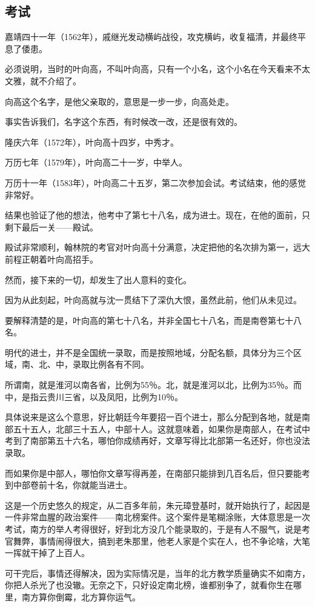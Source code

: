 \begin{multicols}{\theparacolNo}
\subsection{考试}
嘉靖四十一年（1562年），戚继光发动横屿战役，攻克横屿，收复福清，并最终平息了倭患。

必须说明，当时的叶向高，不叫叶向高，只有一个小名，这个小名在今天看来不太文雅，就不介绍了。

向高这个名字，是他父亲取的，意思是一步一步，向高处走。

事实告诉我们，名字这个东西，有时候改一改，还是很有效的。

隆庆六年（1572年），叶向高十四岁，中秀才。

万历七年（1579年），叶向高二十一岁，中举人。

万历十一年（1583年），叶向高二十五岁，第二次参加会试。考试结束，他的感觉非常好。

结果也验证了他的想法，他考中了第七十八名，成为进士。现在，在他的面前，只剩下最后一关——殿试。

殿试非常顺利，翰林院的考官对叶向高十分满意，决定把他的名次排为第一，远大前程正朝着叶向高招手。

然而，接下来的一切，却发生了出人意料的变化。

因为从此刻起，叶向高就与沈一贯结下了深仇大恨，虽然此前，他们从未见过。

要解释清楚的是，叶向高的第七十八名，并非全国七十八名，而是南卷第七十八名。

明代的进士，并不是全国统一录取，而是按照地域，分配名额，具体分为三个区域，南、北、中，录取比例各有不同。

所谓南，就是淮河以南各省，比例为55％。北，就是淮河以北，比例为35％。而中，是指云贵川三省，以及凤阳，比例为10％。

具体说来是这么个意思，好比朝廷今年要招一百个进士，那么分配到各地，就是南部五十五人，北部三十五人，中部十人。这就意味着，如果你是南部人，在考试中考到了南部第五十六名，哪怕你成绩再好，文章写得比北部第一名还好，你也没法录取。

而如果你是中部人，哪怕你文章写得再差，在南部只能排到几百名后，但只要能考到中部卷前十名，你就能当进士。

这是一个历史悠久的规定，从二百多年前，朱元璋登基时，就开始执行了，起因是一件非常血腥的政治案件——南北榜案件。这个案件是笔糊涂账，大体意思是一次考试，南方的举人考得很好，好到北方没几个能录取的，于是有人不服气，说是考官舞弊，事情闹得很大，搞到老朱那里，他老人家是个实在人，也不争论啥，大笔一挥就干掉了上百人。

可干完后，事情还得解决，因为实际情况是，当年的北方教学质量确实不如南方，你把人杀光了也没辙。无奈之下，只好设定南北榜，谁都别争了，就看你生在哪里，南方算你倒霉，北方算你运气。


\end{multicols}
